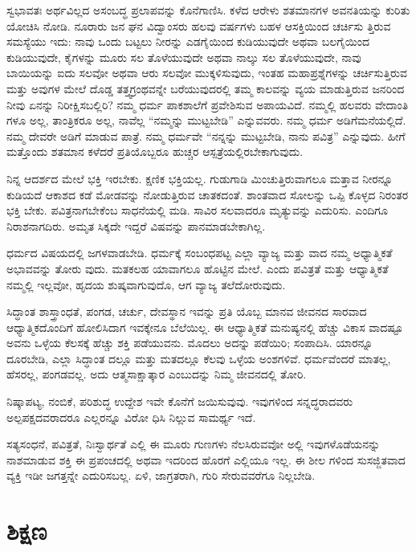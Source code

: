 ಸ್ವಭಾವತಃ ಅರ್ಥವಿಲ್ಲದ ಅಸಂಬದ್ಧ ಪ್ರಲಾಪವನ್ನು ಕೊನೆಗಾಣಿಸಿ. ಕಳೆದ ಆರೇಳು ಶತಮಾನಗಳ ಅವನತಿಯನ್ನು ಕುರಿತು ಯೋಚಿಸಿ ನೋಡಿ. ನೂರಾರು ಜನ ಘನ ವಿದ್ವಾಂಸರು ಹಲವು ವರ್ಷಗಳು ಬಹಳ ಆಸಕ್ತಿಯಿಂದ ಚರ್ಚಿಸು ತ್ತಿರುವ ಸಮಸ್ಯೆಯು ಇದು: ನಾವು ಒಂದು ಬಟ್ಟಲು ನೀರನ್ನು ಎಡಗೈಯಿಂದ ಕುಡಿಯುವುದೇ ಅಥವಾ ಬಲಗೈಯಿಂದ ಕುಡಿಯುವುದೇ, ಕೈಗಳನ್ನು ಮೂರು ಸಲ ತೊಳೆಯುವುದೇ ಅಥವಾ ನಾಲ್ಕು ಸಲ ತೊಳೆಯುವುದೇ, ನಾವು ಬಾಯಿಯನ್ನು ಐದು ಸಲವೋ ಅಥವಾ ಆರು ಸಲವೋ ಮುಕ್ಕಳಿಸುವುದು, ಇಂತಹ ಮಹಾಪ್ರಶ್ನೆಗಳನ್ನು ಚರ್ಚಿಸುತ್ತಿರುವ ಮತ್ತು ಅವುಗಳ ಮೇಲೆ ದೊಡ್ಡ ತತ್ತ್ವಗ್ರಂಥವನ್ನೇ ಬರೆಯುವುದರಲ್ಲಿ ತಮ್ಮ ಕಾಲವನ್ನು ವ್ಯಯ ಮಾಡುತ್ತಿರುವ ಜನರಿಂದ ನೀವು ಏನನ್ನು ನಿರೀಕ್ಷಿಸಬಲ್ಲಿರಿ? ನಮ್ಮ ಧರ್ಮ ಪಾಕಶಾಲೆಗೆ ಪ್ರವೇಶಿಸುವ ಅಪಾಯವಿದೆ. ನಮ್ಮಲ್ಲಿ ಹಲವರು ವೇದಾಂತಿ ಗಳೂ ಅಲ್ಲ, ತಾಂತ್ರಿಕರೂ ಅಲ್ಲ, ನಾವೆಲ್ಲ “ನಮ್ಮನ್ನು ಮುಟ್ಟಬೇಡಿ” ಎನ್ನುವವರು. ನಮ್ಮ ಧರ್ಮ ಅಡಿಗೆಮನೆಯಲ್ಲಿದೆ. ನಮ್ಮ ದೇವರೇ ಅಡಿಗೆ ಮಾಡುವ ಪಾತ್ರೆ. ನಮ್ಮ ಧರ್ಮವೇ “ನನ್ನನ್ನು ಮುಟ್ಟಬೇಡಿ, ನಾನು ಪವಿತ್ರ” ಎನ್ನುವುದು. ಹೀಗೆ ಮತ್ತೊಂದು ಶತಮಾನ ಕಳೆದರೆ ಪ್ರತಿಯೊಬ್ಬರೂ ಹುಚ್ಚರ ಆಸ್ಪತ್ರೆಯಲ್ಲಿರಬೇಕಾಗುವುದು.

ನಿನ್ನ ಆದರ್ಶದ ಮೇಲೆ ಭಕ್ತಿ ಇರಬೇಕು. ಕ್ಷಣಿಕ ಭಕ್ತಿಯಲ್ಲ. ಗುಡುಗಾಡಿ ಮಿಂಚುತ್ತಿರುವಾಗಲೂ ಮತ್ತಾವ ನೀರನ್ನೂ ಕುಡಿಯದೆ ಆಕಾಶದ ಕಡೆ ಮೋಡವನ್ನು ನೋಡುತ್ತಿರುವ ಚಾತಕದಂತೆ. ಶಾಂತವಾದ ಸೋಲನ್ನು ಒಪ್ಪಿ ಕೊಳ್ಳದ ನಿರಂತರ ಭಕ್ತಿ ಬೇಕು. ಪವಿತ್ರನಾಗಬೇಕೆಂಬ ಸಾಧನೆಯಲ್ಲಿ ಮಡಿ. ಸಾವಿರ ಸಲವಾದರೂ ಮೃತ್ಯುವನ್ನು ಎದುರಿಸು. ಎಂದಿಗೂ ನಿರಾಶನಾಗದಿರು. ಅಮೃತ ಸಿಕ್ಕದೇ ಇದ್ದರೆ ವಿಷವನ್ನು ಪಾನಮಾಡಬೇಕಾಗಿಲ್ಲ.

ಧರ್ಮದ ವಿಷಯದಲ್ಲಿ ಜಗಳವಾಡಬೇಡಿ. ಧರ್ಮಕ್ಕೆ ಸಂಬಂಧಪಟ್ಟ ಎಲ್ಲಾ ವ್ಯಾಜ್ಯ ಮತ್ತು ವಾದ ನಮ್ಮ ಅಧ್ಯಾತ್ಮಿಕತೆ ಅಭಾವವನ್ನು ತೋರು ವುದು. ಮತಕಲಹ ಯಾವಾಗಲೂ ಹೊಟ್ಟಿನ ಮೇಲೆ. ಎಂದು ಪವಿತ್ರತೆ ಮತ್ತು ಆಧ್ಯಾತ್ಮಿಕತೆ ನಮ್ಮಲ್ಲಿ ಇಲ್ಲವೋ, ಹೃದಯ ಶುಷ್ಕವಾಗುವುದೊ, ಆಗ ವ್ಯಾಜ್ಯ ತಲೆದೋರುವುದು.

ಸಿದ್ಧಾಂತ ಶಾಸ್ತ್ರಾಂಧತೆ, ಪಂಗಡ, ಚರ್ಚು, ದೇವಸ್ಥಾನ ಇವನ್ನು ಪ್ರತಿ ಯೊಬ್ಬ ಮಾನವ ಜೀವನದ ಸಾರವಾದ ಆಧ್ಯಾತ್ಮಿಕದೊಂದಿಗೆ ಹೋಲಿಸಿದಾಗ ಇವಕ್ಕೇನೂ ಬೆಲೆಯಿಲ್ಲ. ಈ ಆಧ್ಯಾತ್ಮಿಕತೆ ಮನುಷ್ಯನಲ್ಲಿ ಹೆಚ್ಚು ವಿಕಾಸ ವಾದಷ್ಟೂ ಅವನು ಒಳ್ಳೆಯ ಕೆಲಸಕ್ಕೆ ಹೆಚ್ಚು ಶಕ್ತಿ ಪಡೆಯುವನು. ಮೊದಲು ಅದನ್ನು ಪಡೆಯಿರಿ; ಸಂಪಾದಿಸಿ. ಯಾರನ್ನೂ ದೂರಬೇಡಿ, ಎಲ್ಲಾ ಸಿದ್ಧಾಂತ ದಲ್ಲೂ ಮತ್ತು ಮತದಲ್ಲೂ ಕೆಲವು ಒಳ್ಳೆಯ ಅಂಶಗಳಿವೆ. ಧರ್ಮವೆಂದರೆ ಮಾತಲ್ಲ, ಹೆಸರಲ್ಲ, ಪಂಗಡವಲ್ಲ. ಅದು ಆತ್ಮಸಾಕ್ಷಾತ್ಕಾರ ಎಂಬುದನ್ನು ನಿಮ್ಮ ಜೀವನದಲ್ಲಿ ತೋರಿ.

ನಿಷ್ಕಾಪಟ್ಯ, ನಂಬಿಕೆ, ಪರಿಶುದ್ಧ ಉದ್ದೇಶ ಇವೇ ಕೊನೆಗೆ ಜಯಿಸುವುವು. ಇವುಗಳಿಂದ ಸನ್ನದ್ಧರಾದವರು ಅಲ್ಪಪಕ್ಷದವರಾದರೂ ಎಲ್ಲರನ್ನೂ ವಿರೋ ಧಿಸಿ ನಿಲ್ಲುವ ಸಾಮರ್ಥ್ಯ ಇದೆ.

ಸತ್ಯಸಂಧನೆ, ಪವಿತ್ರತೆ, ನಿಃಸ್ವಾರ್ಥತೆ ಎಲ್ಲಿ ಈ ಮೂರು ಗುಣಗಳು ನೆಲಸಿರುವವೋ ಅಲ್ಲಿ ಇವುಗಳೊಡೆಯನನ್ನು ನಾಶಮಾಡುವ ಶಕ್ತಿ ಈ ಪ್ರಪಂಚದಲ್ಲಿ ಅಥವಾ ಇದರಿಂದ ಹೊರಗೆ ಎಲ್ಲಿಯೂ ಇಲ್ಲ. ಈ ಶೀಲ ಗಳಿಂದ ಸುಸಜ್ಜಿತವಾದ ವ್ಯಕ್ತಿ ಇಡೀ ಜಗತ್ತನ್ನೇ ಎದುರಿಸಬಲ್ಲ. ಏಳಿ, ಜಾಗ್ರತರಾಗಿ, ಗುರಿ ಸೇರುವವರೆಗೂ ನಿಲ್ಲಬೇಡಿ.


\section{ಶಿಕ್ಷಣ}

